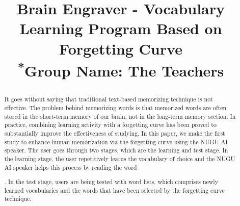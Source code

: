 \documentclass[conference]{IEEEtran}
\begin{document}
\title{Brain Engraver - Vocabulary Learning Program Based on Forgetting Curve\\
{\footnotesize \textsuperscript{*}Group Name: The Teachers}

}

\author{
\and
{}
\and
{}
\and
{}
}

\maketitle

\begin{abstract}
It goes without saying that traditional text-based memorizing technique is not effective. The problem behind memorizing words is that memorized words are often stored in the short-term memory of our brain, not in the long-term memory section. In practice, combining learning activity with a forgetting curve has been proved to substantially improve the effectiveness of studying. In this paper, we make the first study to enhance human memorization via the forgetting curve using the NUGU AI speaker. The user goes through two stages, which are the learning and test stage. In the learning stage, the user repetitively learns the vocabulary of choice and the NUGU AI speaker helps this process by reading the word \begin{comment}and showing the nuance of the word with color\end{comment}. In the test stage, users are being tested with word lists, which comprises newly learned vocabularies and the words that have been selected by the forgetting curve technique.
\end{abstract}
\end{document}
